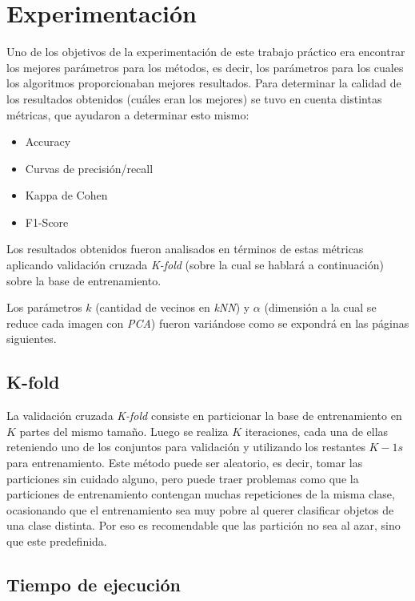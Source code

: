 \section{Experimentación}

Uno de los objetivos de la experimentación de este trabajo práctico era encontrar los mejores parámetros para los métodos, es decir, los parámetros para los cuales los algoritmos proporcionaban mejores resultados. Para determinar la calidad de los resultados obtenidos (cuáles eran los mejores) se tuvo en cuenta distintas métricas, que ayudaron a determinar esto mismo:

\begin{itemize}
\item Accuracy
\item Curvas de precisión/recall
\item Kappa de Cohen
\item F1-Score
\end{itemize}

Los resultados obtenidos fueron analisados en términos de estas métricas aplicando validación cruzada \textit{K-fold} (sobre la cual se hablará a continuación) sobre la base de entrenamiento.

Los parámetros $k$ (cantidad de vecinos en \textit{kNN}) y $\alpha$ (dimensión a la cual se reduce cada imagen con \textit{PCA}) fueron variándose como se expondrá en las páginas siguientes.

\subsection{K-fold}

La validación cruzada \textit{K-fold} consiste en particionar la base de entrenamiento en $K$ partes del mismo tamaño. Luego se realiza $K$ iteraciones, cada una de ellas reteniendo uno de los conjuntos para validación y utilizando los restantes $K - 1s$ para entrenamiento. Este método puede ser aleatorio, es decir, tomar las particiones sin cuidado alguno, pero puede traer problemas como que la particiones de entrenamiento contengan muchas repeticiones de la misma clase, ocasionando que el entrenamiento sea muy pobre al querer clasificar objetos de una clase distinta. Por eso es recomendable que las partición no sea al azar, sino que este predefinida. %

\subsection{Tiempo de ejecución}


